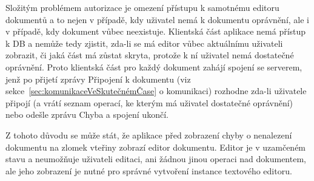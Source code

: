 Složitým problémem autorizace je omezení přístupu k samotnému editoru dokumentů a to nejen v případě, kdy uživatel nemá k dokumentu oprávnění, ale i v případě, kdy dokument vůbec neexistuje.
Klientská část aplikace nemá přístup k DB a nemůže tedy zjistit, zda-li se má editor vůbec aktuálnímu uživateli zobrazit, či jaká část má zůstat skryta, protože k ní uživatel nemá dostatečné oprávnění.
Proto klientská část pro každý dokument zahájí spojení se serverem, jenž po přijetí zprávy Připojení k dokumentu (viz sekce~\ref{sec:komunikaceVeSkutečnémČase} o komunikaci) rozhodne zda-li uživatele připojí (a vrátí seznam operací, ke kterým má uživatel dostatečné oprávnění) nebo odešle zprávu Chyba a spojení ukončí.

Z tohoto důvodu se může stát, že aplikace před zobrazení chyby o nenalezení dokumentu na zlomek vteřiny zobrazí editor dokumentu.
Editor je v uzamčeném stavu a neumožňuje uživateli editaci, ani žádnou jinou operaci nad dokumentem, ale jeho zobrazení je nutné pro správné vytvoření instance textového editoru.
